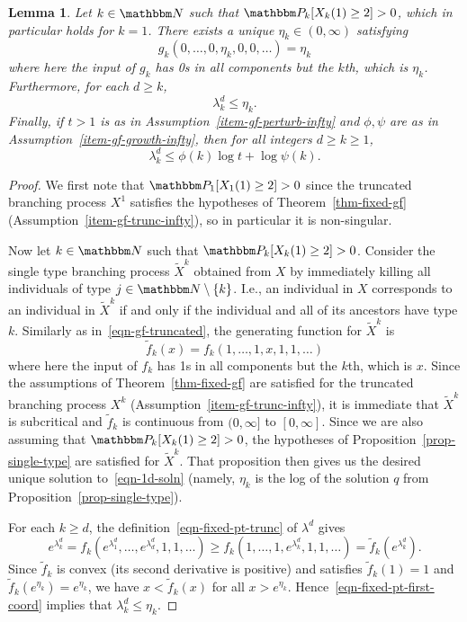 \documentclass[11pt]{article}
\theoremstyle{plain}
\newtheorem{lem}[thm]{Lemma}
\theoremstyle{definition}
\numberwithin{equation}{section}
\newcommand{\eqb}{\begin{equation}}
\newcommand{\eqe}{\end{equation}}
\newcommand{\eqbn}{\begin{equation*}}
\newcommand{\eqen}{\end{equation*}}
\newcommand{\BB}{\mathbbm}
\newcommand{\wt}{\widetilde}
\begin{document}
\begin{lem} \label{lem-1d-soln}
Let $k\in \BB N$ such that $\BB P_k[X_k(1) \geq 2] > 0$, which in particular holds for $k=1$. There exists a unique $\eta_k  \in (0,\infty)$ satisfying 
\eqb  \label{eqn-1d-soln} 
g_k(0,\dots, 0,\eta_k , 0 ,0,\dots) = \eta_k 
\eqe 
where here the input of $g_k$ has 0s in all components but the $k$th, which is $\eta_k $. 
Furthermore, for each $d\geq k$, 
\eqb  \label{eqn-1d-soln-ineq}
\lambda_k^d \leq \eta_k  .
\eqe  
Finally, if $t > 1$ is as in Assumption~\ref{item-gf-perturb-infty} and $\phi,\psi$ are as in Assumption~\ref{item-gf-growth-infty}, then for all integers $d \geq k \geq 1 $, 
\eqb  \label{eqn-1d-soln-growth}
\lambda_k^d \leq \phi(k) \log t + \log\psi(k)  .
\eqe  
\end{lem}
\begin{proof}
We first note that $\BB P_1[X_1(1) \geq 2] >0$ since the truncated branching process $X^1$ satisfies the hypotheses of Theorem~\ref{thm-fixed-gf} (Assumption~\ref{item-gf-trunc-infty}), so in particular it is non-singular.

Now let $k\in \BB N$ such that $\BB P_k[X_k(1) \geq 2] > 0$. 
Consider the single type branching process $\wt X^k$ obtained from $X$ by immediately killing all individuals of type $j \in \BB N\setminus \{k\}$. I.e., an individual in $X$ corresponds to an individual in $\wt X^k$ if and only if the individual and all of its ancestors have type $k$. Similarly as in~\eqref{eqn-gf-truncated}, the generating function for $\wt X^k$ is
\eqbn
\wt f_k(x) = f_k(1,\dots,1,x,1,1,\dots) 
\eqen
where here the input of $f_k$ has 1s in all components but the $k$th, which is $x$. 
Since the assumptions of Theorem~\ref{thm-fixed-gf} are satisfied for the truncated branching process $X^k$ (Assumption~\ref{item-gf-trunc-infty}), it is immediate that $\wt X^k$ is subcritical and $\wt f_k$ is continuous from $(0,\infty]$ to $[0,\infty]$. Since we are also assuming that $\BB P_k[X_k(1) \geq 2] > 0$, the hypotheses of Proposition~\ref{prop-single-type} are satisfied for $\wt X^k$. That proposition then gives us the desired unique solution to~\eqref{eqn-1d-soln} (namely, $\eta_k$ is the log of the solution $q$ from Proposition~\ref{prop-single-type}). 

For each $k\geq d$, the definition~\eqref{eqn-fixed-pt-trunc} of $\lambda^d$ gives
\eqb \label{eqn-fixed-pt-first-coord}
e^{\lambda_k^d} 
= f_k(e^{\lambda_1^d} , \dots , e^{\lambda_d^d} , 1,1,\dots) 
\geq f_k(1,\dots,1 , e^{\lambda_k^d} , 1,1,\dots)
= \wt f_k(e^{\lambda_k^d}) .
\eqe 
Since $\wt f_k$ is convex (its second derivative is positive) and satisfies $\wt f_k(1) = 1$ and $\wt f_k(e^{\eta_k}) = e^{\eta_k}$, we have $x < \wt f_k(x)$ for all $x  >  e^{\eta_k} $. Hence~\eqref{eqn-fixed-pt-first-coord} implies that $\lambda_k^d \leq \eta_k$.


\end{proof}
\end{document}
